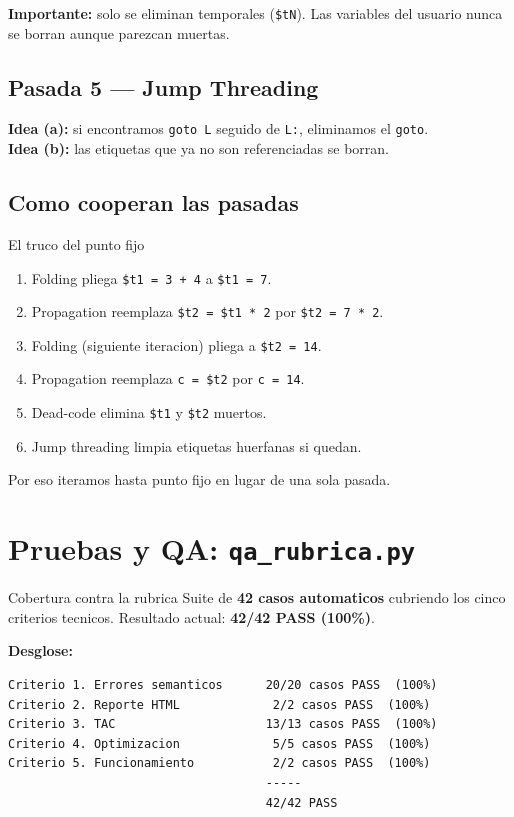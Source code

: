\documentclass[11pt,a4paper]{article}
\begin{document}
\textbf{Importante:} solo se eliminan temporales (\texttt{\$tN}). Las
variables del usuario nunca se borran aunque parezcan muertas.

\subsection{Pasada 5 --- Jump Threading}

\textbf{Idea (a):} si encontramos \texttt{goto L} seguido de
\texttt{L:}, eliminamos el \texttt{goto}. \\
\textbf{Idea (b):} las etiquetas que ya no son referenciadas se borran.

\subsection{Como cooperan las pasadas}

\begin{caja}{El truco del punto fijo}
\begin{enumerate}[leftmargin=*,nosep]
  \item Folding pliega \texttt{\$t1 = 3 + 4} a \texttt{\$t1 = 7}.
  \item Propagation reemplaza \texttt{\$t2 = \$t1 * 2} por
        \texttt{\$t2 = 7 * 2}.
  \item Folding (siguiente iteracion) pliega a \texttt{\$t2 = 14}.
  \item Propagation reemplaza \texttt{c = \$t2} por \texttt{c = 14}.
  \item Dead-code elimina \texttt{\$t1} y \texttt{\$t2} muertos.
  \item Jump threading limpia etiquetas huerfanas si quedan.
\end{enumerate}
Por eso iteramos hasta punto fijo en lugar de una sola pasada.
\end{caja}

\section{Pruebas y QA: \texttt{qa\_rubrica.py}}

\begin{rubrica}{Cobertura contra la rubrica}
Suite de \textbf{42 casos automaticos} cubriendo los cinco criterios
tecnicos. Resultado actual: \textbf{42/42 PASS (100\%)}.
\end{rubrica}

\textbf{Desglose:}

\begin{lstlisting}[style=tac]
Criterio 1. Errores semanticos      20/20 casos PASS  (100%)
Criterio 2. Reporte HTML             2/2 casos PASS  (100%)
Criterio 3. TAC                     13/13 casos PASS  (100%)
Criterio 4. Optimizacion             5/5 casos PASS  (100%)
Criterio 5. Funcionamiento           2/2 casos PASS  (100%)
                                    -----
                                    42/42 PASS
\end{lstlisting}
\end{document}
